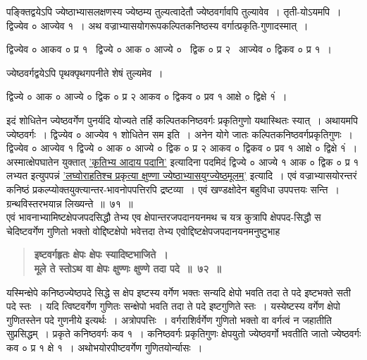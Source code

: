 \documentclass[11pt, openany]{book}
\begin{document}
\begin{sloppypar}
पङ्क्तिद्वयेऽपि ज्येष्ठाभ्यासलक्षणस्य ज्येष्ठम्य तुल्यत्वादेतौ ज्येष्ठवर्गावपि तुल्यावेव~। तृती-योऽयमपि~। द्विज्येव ० आज्येव १~। अथ वज्राभ्यासयोगरूपकल्पितकनिष्ठस्य वर्गात्प्रकृति-गुणादस्मात्~। 

\begin{center}
{\small द्विज्येव ० आकव ० प्र १ ~द्विज्ये ० आक ० आज्ये ० ~द्विक ० प्र २ ~आज्येव ० द्विकव ० प्र १~।}
\end{center}

ज्येष्ठवर्गद्वयेऽपि पृथक्पृथगपनीते शेषं तुल्यमेव~।
\end{sloppypar}

\newpage

\begin{sloppypar}
\begin{center}
द्विज्ये ० आक ० आज्ये ० द्विक ० प्र २ आकव ० द्विकव ० प्रव १ आक्षे ० द्विक्षे १ं~।
\end{center}

इदं शोधितेन ज्येष्ठवर्गेण पुनर्यदि योज्यते तर्हि कल्पितकनिष्ठवर्गः प्रकृतिगुणो यथास्थितः स्यात्~। अथायमपि ज्येष्ठवर्गः~। द्विज्येव ० आज्येव १ शोधितेन सम इति~। अनेन योगे जातः कल्पितकनिष्ठवर्गप्रकृतिगुणः~। द्विज्येव ० आज्येव १ द्विज्ये ० आक ० आज्ये ० द्विक ० प्र २ आकव ० द्विकव ० प्रव १ आक्षे ० द्विक्षे १ं~।\\

अस्मात्क्षेपघातेन युक्तात् \hyperref[3.31]{'कृतिभ्य आदाय पदानि'} इत्यादिना पदमिदं द्विज्ये ० आज्ये १ आक ० द्विक ० प्र १ लभ्यत इत्युपपन्नं \hyperref[6.71]{'लघ्वोराहतिश्च प्रकृत्या क्षुण्णा ज्येष्ठाभ्यासयुग्ज्येष्ठमूलम्'} इत्यादि~। एवं वज्राभ्यासयोरन्तरं कनिष्ठं प्रकल्प्योक्तयुक्त्यान्तर-भावनोपपत्तिरपि द्रष्टव्या~। एवं खण्डक्षोदेन बहुविधा उपपत्तयः सन्ति~। ग्रन्थविस्तरभयान्न लिख्यन्ते~॥~७१~॥\\

{\small एवं भावनाभ्यामिष्टक्षेपजपदसिद्धौ तेभ्य एव क्षेपान्तरजपदानयनमथ च यत्र कुत्रापि क्षेपपद-सिद्धौ स चेदिष्टवर्गेण गुणितो भक्तो वोद्दिष्टक्षेपो भवेत्तदा तेभ्य एवोद्दिष्टक्षेपजपदानयनमनुष्टुभाह\textendash }

 \label{6.72}
\begin{quote}
{\large \textbf{{\color{purple}इष्टवर्गहृतः क्षेपः क्षेपः स्यादिष्टभाजिते~।\\
मूले ते स्तोऽथ वा क्षेपः क्षुण्णः क्षुण्णे तदा पदे~॥~७२~॥}}}
\end{quote}

यस्मिन्क्षेपे कनिष्ठज्येष्ठपदे सिद्धे स क्षेप इष्टस्य वर्गेण भक्तः सन्यदि क्षेपो भवति तदा ते पदे इष्टभक्ते सती पदे स्तः~। यदि त्विष्टवर्गेण गुणितः सन्क्षेपो भवति तदा ते पदे इष्टगुणिते स्तः~। यस्येष्टस्य वर्गेण क्षेपो गुणितस्तेन पदे गुणनीये इत्यर्थः~। अत्रोपपत्तिः~। वर्गराशिर्वर्गेण गुणितो भक्तो वा वर्गत्वं न जहातीति सुप्रसिद्धम्~। प्रकृते कनिष्ठवर्गः कव १~। कनिष्ठवर्गः प्रकृतिगुणः क्षेपयुतो ज्येष्ठवर्गो भवतीति जातो ज्येष्ठवर्गः कव ० प्र १ क्षे १~। अथोभयोरपीष्टवर्गेण गुणितयोर्न्यासः~। 


\end{sloppypar}
\end{document}
